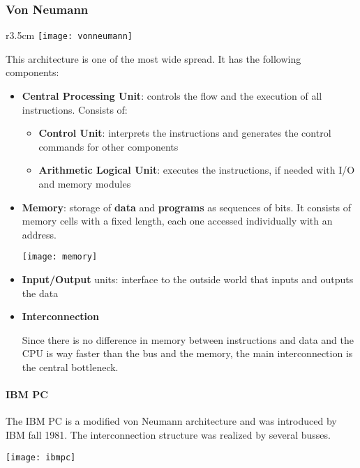 \subsubsection{Von Neumann}
\begin{wrapfigure}{r}{3.5cm}
	\texttt{[image: vonneumann]}
\end{wrapfigure}
This architecture is one of the most wide spread. It has the following components:
\begin{itemize}
	\item \textbf{Central Processing Unit}: controls the flow and the execution of all instructions. Consists of:
	\begin{itemize}
		\item \textbf{Control Unit}: interprets the instructions and generates the control commands for other components
		\item \textbf{Arithmetic Logical Unit}: executes the instructions, if needed with I/O and memory modules
	\end{itemize}
	\item \textbf{Memory}: storage of \textbf{data} and \textbf{programs} as sequences of bits. It consists of memory cells with a fixed length, each one accessed individually with an address.
	\begin{center}
		\texttt{[image: memory]}
	\end{center}
	\item \textbf{Input/Output} units: interface to the outside world that inputs and outputs the data
	\item \textbf{Interconnection}
	\begin{observation}
		Since there is no difference in memory between instructions and data and the CPU is way faster than the bus and the memory, the main interconnection is the central bottleneck.
	\end{observation}
\end{itemize}

\paragraph{IBM PC}
The IBM PC is a modified von Neumann architecture and was introduced by IBM fall 1981. The interconnection structure was realized by several busses.
\begin{center}
	\texttt{[image: ibmpc]}
\end{center}

